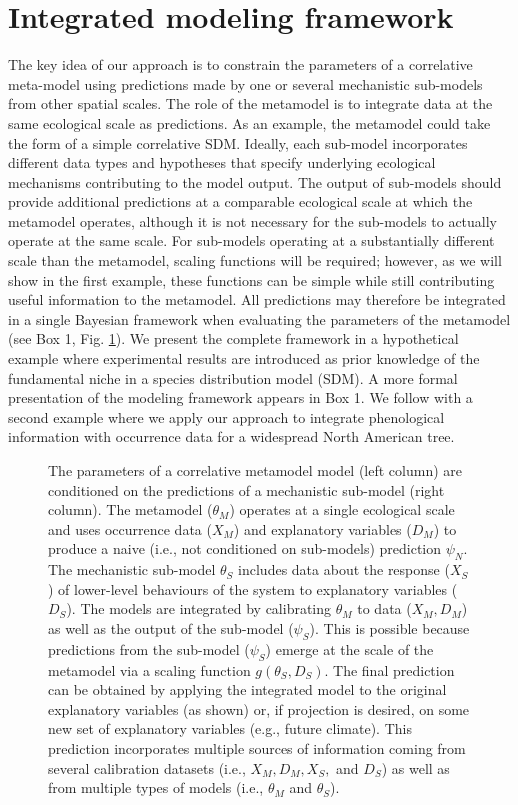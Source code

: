 \section*{Integrated modeling framework}

The key idea of our approach is to constrain the parameters of a correlative meta-model using predictions made by one or several mechanistic sub-models from other spatial scales.
The role of the metamodel is to integrate data at the same ecological scale as predictions. 
As an example, the metamodel could take the form of a simple correlative \ac{SDM}.
Ideally, each sub-model incorporates different data types and hypotheses that specify underlying ecological mechanisms contributing to the model output.
The output of sub-models should provide additional predictions at a comparable ecological scale at which the metamodel operates, although it is not necessary for the sub-models to actually operate at the same scale.
For sub-models operating at a substantially different scale than the metamodel, scaling functions will be required; however, as we will show in the first example, these functions can be simple while still contributing useful information to the metamodel. 
All predictions may therefore be integrated in a single Bayesian framework when evaluating the parameters of the metamodel (see Box 1, Fig. \ref{fig:diagram}).
We present the complete framework in a hypothetical example where experimental results are  introduced as prior knowledge of the fundamental niche in a species distribution model (SDM).
A more formal presentation of the modeling framework appears in Box 1.
We follow with a second example where we apply our approach to integrate phenological information with occurrence data for a widespread North American tree.


\begin{figure}

\caption{The parameters of a correlative metamodel model (left column) are conditioned on the predictions of a mechanistic sub-model (right column).
The metamodel ($\theta_M$) operates at a single ecological scale and uses occurrence data (\(X_M\)) and explanatory variables ($D_M$) to produce a naive (i.e., not conditioned on sub-models) prediction $\psi_N$.
The mechanistic sub-model \(\theta_S\) includes data about the response (\(X_S\)) of lower-level behaviours of the system to explanatory variables ($D_S$). 
The models are integrated by calibrating $\theta_M$ to data ($X_M, D_M$) as well as the output of the sub-model ($\psi_S$). 
This is possible because predictions from the sub-model ($\psi_S$) emerge at the scale of the metamodel via a scaling function \(g(\theta_S, D_S)\).
The final prediction can be obtained by applying the integrated model to the original explanatory variables (as shown) or, if projection is desired, on some new set of explanatory variables (e.g., future climate).
This prediction incorporates multiple sources of information coming from several calibration datasets (i.e., $X_M, D_M, X_S, $ and $D_S$) as well as from multiple types of models (i.e., $\theta_M$ and $\theta_S$).
}
\label{fig:diagram}
\end{figure}


